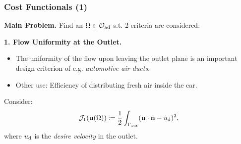 \documentclass[10pt,xcolor=table,english]{beamer}   %
\begin{document}
\begin{frame}
    \frametitle{Cost Functionals (1)}
    \textbf{Main Problem.} Find an $\Omega\in\mathcal{O}_{\rm ad}$ s.t. 2 criteria are considered:
    \vspace{1cm}
    
    \textbf{1. Flow Uniformity at the Outlet.} 
    \begin{itemize}
        \item The uniformity of the flow upon leaving the outlet plane is an important design criterion of e.g. \textit{automotive air ducts}.
        \item Other use: Efficiency of distributing fresh air inside the car.%
    \end{itemize}
    Consider:	
    \begin{align*}
    \mathcal{J}_1({\bf u}(\Omega))\coloneqq \frac{1}{2}\int_{\Gamma_{\rm out}} ({\bf u}\cdot {\bf n} - u_{\rm d})^2,
    \end{align*}
    where $u_{\rm d}$ is the \textit{desire velocity} in the outlet.
    
\end{frame}
\end{document}
